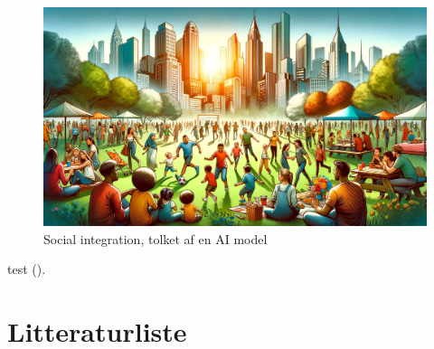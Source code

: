 \documentclass[
]{book}
\begin{document}
\begin{figure}
\includegraphics[width=1\linewidth]{images/dalle-integration} \caption{Social integration, tolket af en AI model}\label{fig:fig-integration}
\end{figure}

test ().

\chapter*{Litteraturliste}\label{litteraturliste}
\end{document}
